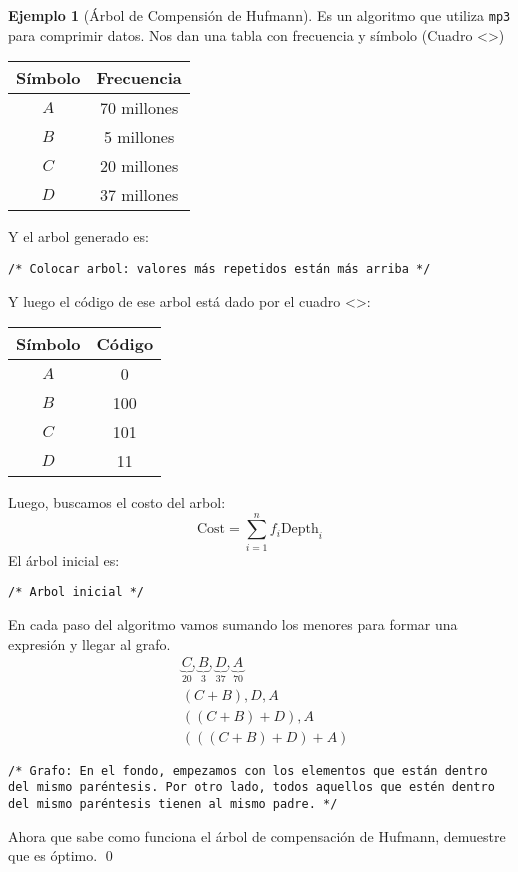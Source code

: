 \documentclass[english, spanish, fleqn, 10pt]{article}
\newcommand{\comentarioc}[1]{\texttt{\textcolor{webred}{/* #1 */}}}
\numberwithin{equation}{section}
\newcommand{\nparentesis}[1]{\left( #1 \right)}
\theoremstyle{definition}
\newtheorem{beforeExample}{Ejemplo}[section]
\newenvironment{ejemplo}[1][]{\begin{beforeExample}[#1]\renewcommand{\qedsymbol}{$\blacksquare$}}{\qed\end{beforeExample}}
\begin{document}
\begin{ejemplo}[Árbol de Compensión de Hufmann]
	Es un algoritmo que utiliza \texttt{mp3} para comprimir datos. Nos dan una tabla con frecuencia y símbolo (Cuadro <>)
	\begin{table}[!h]
		\centering
		\begin{tabular}{c|c}
			Símbolo & Frecuencia\\
			\hline
			$A$&70 millones\\
			$B$&5 millones\\
			$C$&20 millones\\
			$D$&37 millones
		\end{tabular}
	\end{table}
	Y el arbol generado es:
	\begin{figure}[!h]
		\centering
	\end{figure}
	\begin{center}
		\comentarioc{Colocar arbol: valores más repetidos están más arriba}
	\end{center}
	Y luego el código de ese arbol está dado por el cuadro <>:
	\begin{table}
		\centering
		\begin{tabular}{c|c}
			Símbolo & Código\\
			\hline
			$A$&0\\
			$B$&100\\
			$C$&101\\
			$D$&11
		\end{tabular}
	\end{table}
	Luego, buscamos el costo del arbol:
	\begin{equation}
	\text{Cost}=\sum_{i=1}^nf_i\text{Depth}_i
	\end{equation}
	El árbol inicial es:
	\begin{center}
		\comentarioc{Arbol inicial}
	\end{center}
	En cada paso del algoritmo vamos sumando los menores para formar una expresión y llegar al grafo.
	\begin{align*}
	&\underbrace{C}_{20}, \underbrace{B}_{3}, \underbrace{D}_{37}, \underbrace{A}_{70}\\
	&\nparentesis{C+B}, D, A\\
	&\nparentesis{\nparentesis{C+B}+D}, A\\
	&\nparentesis{\nparentesis{\nparentesis{C+B}+D}+A}
	\end{align*}
	\begin{center}
		\comentarioc{Grafo: En el fondo, empezamos con los elementos que están dentro del mismo paréntesis. Por otro lado, todos aquellos que estén dentro del mismo paréntesis tienen al mismo padre.}
	\end{center}
	Ahora que sabe como funciona el árbol de compensación de Hufmann, demuestre que es óptimo.
\end{ejemplo}
\end{document}
